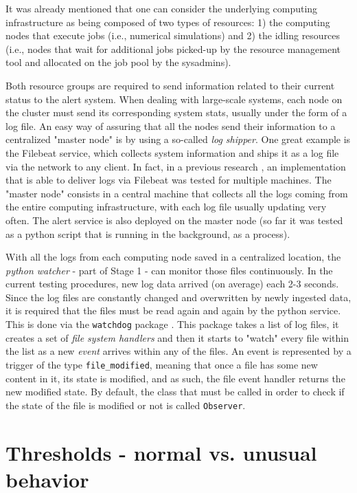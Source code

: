\documentclass[conference]{IEEEtran}
\begin{document}
It was already mentioned that one can consider the underlying computing infrastructure as being composed of two types of resources: 1) the computing nodes that execute jobs (i.e., numerical simulations) and 2) the idling resources (i.e., nodes that wait for additional jobs picked-up by the resource management tool and allocated on the job pool by the sysadmins).
\par Both resource groups are required to send information related to their current status to the alert system. When dealing with large-scale systems, each node on the cluster must send its corresponding system stats, usually under the form of a log file. An easy way of assuring that all the nodes send their information to a centralized "master node" is by using a so-called \emph{log shipper}. One great example is the Filebeat \cite{filebeat} service, which collects system information and ships it as a log file via the network to any client. In fact, in a previous research \cite{poenaru-elk}, an implementation that is able to deliver logs via Filebeat was tested for multiple machines. The "master node" consists in a central machine that collects all the logs coming from the entire computing infrastructure, with each log file usually updating very often. The alert service is also deployed on the master node (so far it was tested as a python script that is running in the background, as a process).
\par With all the logs from each computing node saved in a centralized location, the \emph{python watcher} - part of Stage 1 - can monitor those files continuously. In the current testing procedures, new log data arrived (on average) each 2-3 seconds. Since the log files are constantly changed and overwritten by newly ingested data, it is required that the files must be read again and again by the python service. This is done via the \texttt{watchdog} package \cite{watchdog}. This package takes a list of log files, it creates a set of \emph{file system handlers} and then it starts to "watch" every file within the list as a new \emph{event} arrives within any of the files. An event is represented by a trigger of the type \texttt{file\_modified}, meaning that once a file has some new content in it, its state is modified, and as such, the file event handler returns the new modified state. By default, the class that must be called in order to check if the state of the file is modified or not is called \texttt{Observer}.

\section{Thresholds - normal vs. unusual behavior}
\label{section-thresholds}
\end{document}

